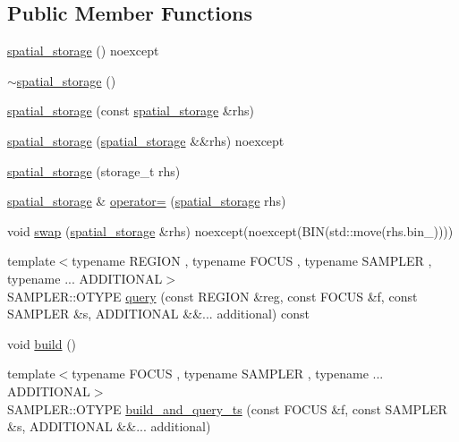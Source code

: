\subsection*{Public Member Functions}
\begin{DoxyCompactItemize}
\item 
\hyperlink{classmui_1_1spatial__storage_af0eec3fcfc27ae97839edd4a23bc0169}{spatial\+\_\+storage} () noexcept
\item 
\hyperlink{classmui_1_1spatial__storage_a524b87e9a430bcdf8f9437ebe4c1d642}{$\sim$spatial\+\_\+storage} ()
\item 
\hyperlink{classmui_1_1spatial__storage_a821dd78256426103090a45f769b9903f}{spatial\+\_\+storage} (const \hyperlink{classmui_1_1spatial__storage}{spatial\+\_\+storage} \&rhs)
\item 
\hyperlink{classmui_1_1spatial__storage_a9d2d9d0b277a0d72b56b2af35787d74b}{spatial\+\_\+storage} (\hyperlink{classmui_1_1spatial__storage}{spatial\+\_\+storage} \&\&rhs) noexcept
\item 
\hyperlink{classmui_1_1spatial__storage_a0b8280451b180584440d4b1971ee2980}{spatial\+\_\+storage} (storage\+\_\+t rhs)
\item 
\hyperlink{classmui_1_1spatial__storage}{spatial\+\_\+storage} \& \hyperlink{classmui_1_1spatial__storage_aa7c34670ff584fcf64533cd8980522a2}{operator=} (\hyperlink{classmui_1_1spatial__storage}{spatial\+\_\+storage} rhs)
\item 
void \hyperlink{classmui_1_1spatial__storage_a81252131a0ac8535291fd644b0a5af54}{swap} (\hyperlink{classmui_1_1spatial__storage}{spatial\+\_\+storage} \&rhs) noexcept(noexcept(B\+IN(std\+::move(rhs.\+bin\+\_\+))))
\item 
{\footnotesize template$<$typename R\+E\+G\+I\+ON , typename F\+O\+C\+US , typename S\+A\+M\+P\+L\+ER , typename ... A\+D\+D\+I\+T\+I\+O\+N\+AL$>$ }\\S\+A\+M\+P\+L\+E\+R\+::\+O\+T\+Y\+PE \hyperlink{classmui_1_1spatial__storage_aeac746bbdb7df7a649d3f56e2c3b0691}{query} (const R\+E\+G\+I\+ON \&reg, const F\+O\+C\+US \&f, const S\+A\+M\+P\+L\+ER \&s, A\+D\+D\+I\+T\+I\+O\+N\+AL \&\&... additional) const
\item 
void \hyperlink{classmui_1_1spatial__storage_ab3ba87f495c052e4bfd90af44402c478}{build} ()
\item 
{\footnotesize template$<$typename F\+O\+C\+US , typename S\+A\+M\+P\+L\+ER , typename ... A\+D\+D\+I\+T\+I\+O\+N\+AL$>$ }\\S\+A\+M\+P\+L\+E\+R\+::\+O\+T\+Y\+PE \hyperlink{classmui_1_1spatial__storage_a74508b30f32188bf5252d1c5eb99933d}{build\+\_\+and\+\_\+query\+\_\+ts} (const F\+O\+C\+US \&f, const S\+A\+M\+P\+L\+ER \&s, A\+D\+D\+I\+T\+I\+O\+N\+AL \&\&... additional)

\end{DoxyCompactItemize}
